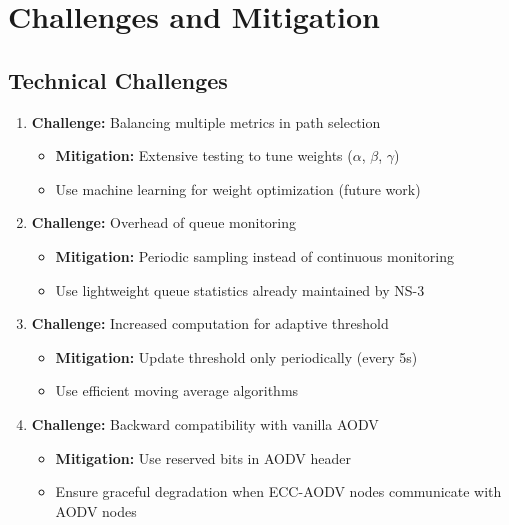 \documentclass[12pt,a4paper]{article}
\begin{document}
\section{Challenges and Mitigation}

\subsection{Technical Challenges}

\begin{enumerate}
    \item \textbf{Challenge:} Balancing multiple metrics in path selection
    \begin{itemize}
        \item \textbf{Mitigation:} Extensive testing to tune weights ($\alpha$, $\beta$, $\gamma$)
        \item Use machine learning for weight optimization (future work)
    \end{itemize}
    
    \item \textbf{Challenge:} Overhead of queue monitoring
    \begin{itemize}
        \item \textbf{Mitigation:} Periodic sampling instead of continuous monitoring
        \item Use lightweight queue statistics already maintained by NS-3
    \end{itemize}
    
    \item \textbf{Challenge:} Increased computation for adaptive threshold
    \begin{itemize}
        \item \textbf{Mitigation:} Update threshold only periodically (every 5s)
        \item Use efficient moving average algorithms
    \end{itemize}
    
    \item \textbf{Challenge:} Backward compatibility with vanilla AODV
    \begin{itemize}
        \item \textbf{Mitigation:} Use reserved bits in AODV header
        \item Ensure graceful degradation when ECC-AODV nodes communicate with AODV nodes
    \end{itemize}
\end{enumerate}
\end{document}
